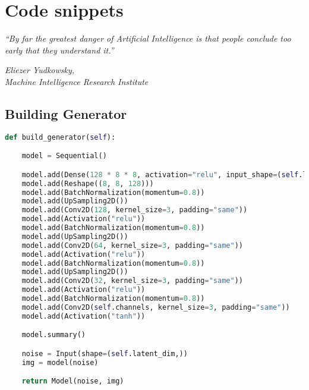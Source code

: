 {\chapter{Code snippets}\label{ch:scope}}
\epigraph{\textit{\normalsize “By far the greatest danger of Artificial Intelligence is that people conclude too early that they understand it.”}}{\textit{ \normalsize Eliezer Yudkowsky,\\ Machine Intelligence Research Institute}}

\section{Building Generator} %
\label{sec:building_generator}
\begin{lstlisting}[basicstyle=\scriptsize,language=Python]
def build_generator(self):

    model = Sequential()

    model.add(Dense(128 * 8 * 8, activation="relu", input_shape=(self.latent_dim,)))
    model.add(Reshape((8, 8, 128)))
    model.add(BatchNormalization(momentum=0.8))
    model.add(UpSampling2D())
    model.add(Conv2D(128, kernel_size=3, padding="same"))
    model.add(Activation("relu"))
    model.add(BatchNormalization(momentum=0.8))
    model.add(UpSampling2D())
    model.add(Conv2D(64, kernel_size=3, padding="same"))
    model.add(Activation("relu"))
    model.add(BatchNormalization(momentum=0.8))
    model.add(UpSampling2D())
    model.add(Conv2D(32, kernel_size=3, padding="same"))
    model.add(Activation("relu"))
    model.add(BatchNormalization(momentum=0.8))
    model.add(Conv2D(self.channels, kernel_size=3, padding="same"))
    model.add(Activation("tanh"))

    model.summary()

    noise = Input(shape=(self.latent_dim,))
    img = model(noise)

    return Model(noise, img)

\end{lstlisting}
